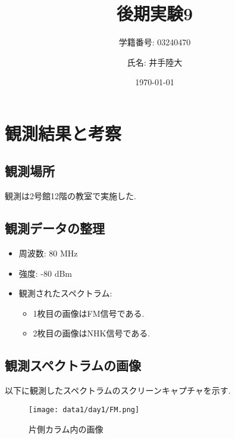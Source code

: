 \documentclass[a4paper, twocolumn]{article} %
\title{後期実験9}
\author{学籍番号: 03240470 \and 氏名: 井手陸大}
\date{\today}
\begin{document}
\maketitle

\section{観測結果と考察}
\subsection{観測場所}
観測は2号館12階の教室で実施した.

\subsection{観測データの整理}
\begin{itemize}
    \item 周波数: 80 MHz
    \item 強度: -80 dBm
    \item 観測されたスペクトラム:
    \begin{itemize}
        \item 1枚目の画像はFM信号である.
        \item 2枚目の画像はNHK信号である.
    \end{itemize}
\end{itemize}

\subsection{観測スペクトラムの画像}
以下に観測したスペクトラムのスクリーンキャプチャを示す.

\begin{figure}[H]
    \centering
    \texttt{[image: data1/day1/FM.png]}
    \caption{片側カラム内の画像}
    \label{fig:image1}
\end{figure}
\end{document}
